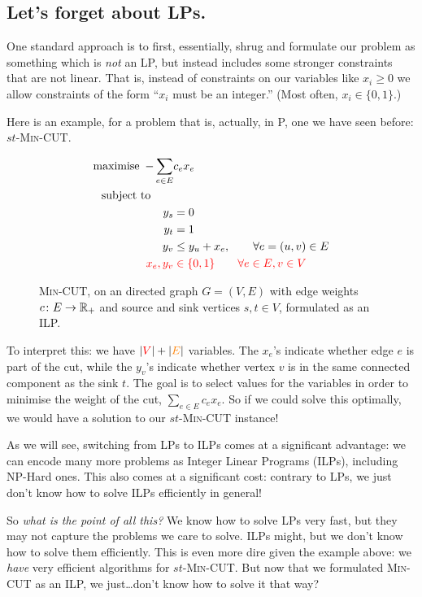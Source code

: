 \subsection{Let's forget about LPs.} One standard approach is to first, essentially, shrug and formulate our problem as something which is \emph{not} an LP, but instead includes some stronger constraints that are not linear. That is, instead of constraints on our variables like $x_i \geq 0$ we allow constraints of the form ``$x_i$ must be an integer.'' (Most often, $x_i \in\{0,1\}$.) 

Here is an example, for a problem that is, actually, in \textsf{P}, one we have seen before: $st$-\textsc{Min-CUT}.
\begin{figure}[htbp!]
\begin{align*}
    \operatorname{maximise}\ -\sum_{e\in E}& c_ex_e\\
    \text{subject to}\qquad&  \\
    y_s &= 0\\
    y_t &= 1\\
    y_v &\leq y_u + x_e, \qquad \forall e=(u,v)\in E\\
    \color{red}x_e, y_v &\color{red}\in \{0,1\}\qquad \forall e\in E, v\in V
\end{align*}
\caption{\textsc{Min-CUT}, on an directed graph $G=(V,E)$ with edge weights $c\colon E\to \mathbb{R}_+$ and source and sink vertices $s,t\in V$, formulated as an ILP.}
\end{figure}
To interpret this: we have $|\textcolor{red}{V}|+|\textcolor{orange}{E}|$ variables. The $x_e$'s indicate whether edge $e$ is part of the cut, while the $y_v$'s indicate whether vertex $v$ is in the same connected component as the sink $t$. The goal is to select values for the variables in order to minimise the weight of the cut, $\sum_{e\in E} c_ex_e$. 
So if we could solve this optimally, we would have a solution to our $st$-\textsc{Min-CUT} instance!\smallskip

As we will see, switching from LPs to ILPs comes at a significant advantage: we can encode many more problems as Integer Linear Programs (ILPs), including \textsf{NP-Hard} ones. This also comes at a significant cost: contrary to LPs, we just don't know how to solve ILPs efficiently in general!

So \emph{what is the point of all this?} We know how to solve LPs very fast, but they may not capture the problems we care to solve. ILPs might, but we don't know how to solve them efficiently. This is even more dire given the example above: we \emph{have} very efficient algorithms for $st$-\textsc{Min-CUT}. But now that we formulated \textsc{Min-CUT} as an ILP, we just\dots don't know how to solve it that way?

